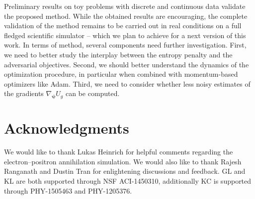 \documentclass[twocolumn,superscriptaddress,aps]{revtex4-1}
\newcommand{\bftheta}{{\bm \theta}}
\newcommand{\bfpsi}{{\bm \psi}}
\newcommand{\bfz}{\mathbf{z}}
\theoremstyle{plain}
\begin{document}
Preliminary results on toy problems with discrete and continuous data validate
the proposed method. While the obtained results are encouraging, the complete
validation of the method remains to be carried out in real conditions on a full
fledged scientific simulator -- which we plan to achieve for a next version of
this work. In terms of method, several components need further investigation.
First, we need to better study the interplay between the entropy penalty and the
adversarial objectives. Second, we should better understand the dynamics of the
optimization procedure, in particular when combined with momentum-based
optimizers like Adam. Third, we need to consider whether less noisy estimates of
the gradients $\nabla_\bfpsi U_g$ can be computed.



\vspace{0.4cm}
\section*{Acknowledgments}

We would like to thank Lukas Heinrich for helpful comments regarding
the electron--positron annihilation simulation. We would also like to thank
Rajesh Ranganath and Dustin Tran for enlightening discussions and feedback.
GL and KL are both supported through NSF ACI-1450310, additionally KC is
supported through PHY-1505463 and PHY-1205376.



\vspace{2cm}

%


\end{document}
